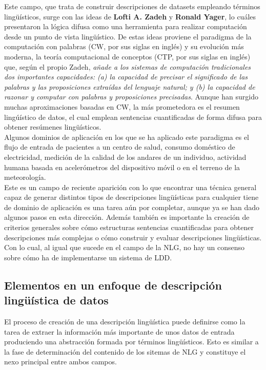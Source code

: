 \documentclass[10pt,a4paper]{article}
\begin{document}
Este campo, que trata de construir descripciones de datasets empleando términos lingüísticos, surge con las ideas de \textbf{Lofti A. Zadeh} y \textbf{Ronald Yager}, lo cuáles presentaron la lógica difusa como una herramienta para realizar computación desde un punto de vista lingüístico. De estas ideas proviene el paradigma de la computación con palabras (CW, por sus siglas en inglés) y su evolución más moderna, la teoría computacional de conceptos (CTP, por sus siglas en inglés) que, según el propio Zadeh, \textit{añade a los sistemas de computación tradicionales dos importantes capacidades: (a) la capacidad de precisar el significado de las palabras y las proposiciones extraídas del lenguaje natural; y (b) la capacidad de razonar y computar con palabras y proposiciones precisadas}. Aunque han surgido muchas aproximaciones basadas en CW, la más prometedora es el resumen lingúístico de datos, el cual emplean sentencias cuantificadas de forma difusa para obtener resúmenes lingüísticos.\\

Algunos dominios de aplicación en los que se ha aplicado este paradigma es el flujo de entrada de pacientes a un centro de salud, consumo doméstico de electricidad, medición de la calidad de los andares de un individuo, actividad humana basada en acelerómetros del dispositivo móvil o en el terreno de la meteorología.\\

Este es un campo de reciente aparición con lo que encontrar una técnica general capaz de generar distintos tipos de descripciones lingüísticas para cualquier tiene de dominio de aplicación es una tarea aún por completar, aunque ya se han dado algunos pasos en esta dirección. Además también es importante la creación de criterios generales sobre cómo estructuras sentencias cuantificadas para obtener descripciones más complejas o cómo construir y evaluar descripciones lingüísticas. Con lo cual, al igual que sucede en el campo de la NLG, no hay un consenso sobre cómo ha de implementarse un sistema de LDD.

\subsection{Elementos en un enfoque de descripción lingüística de datos}

El proceso de creación de una descripción lingüística puede definirse como la tarea de extraer la información más importante de unos datos de entrada produciendo una abstracción formada por términos lingüísticos. Esto es similar a la fase de determinación del contenido de los sitemas de NLG y constituye el nexo principal entre ambos campos.\\
\end{document}

